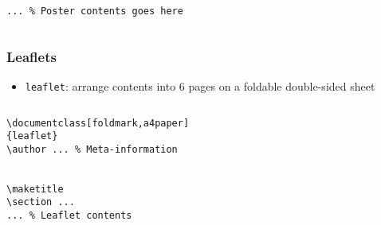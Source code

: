 \begin{frame}[fragile]
\begin{columns}
\begin{column}{.5\textwidth}
\begin{beamerboxesrounded}[width=\linewidth]{}
\begin{lstlisting}[basicstyle=\ttfamily\small,
moretexcs={usetheme,frametitle,frame},
emph={beamer,beamerposter,frame},
escapechar={:},lineskip=-2pt]
... % Poster contents goes here

\end{lstlisting}
\end{beamerboxesrounded}
\end{column}
\begin{column}{.48\textwidth}
\centering
%
\end{column}
\end{columns}

\end{frame}


\begin{frame}[fragile]
\frametitle{Leaflets}

\begin{itemize}
\item \texttt{leaflet}: arrange contents into 6 pages on a foldable double-sided sheet
\end{itemize}

\begin{columns}
\begin{column}{.496\textwidth}
\begin{beamerboxesrounded}[width=\linewidth]{}
\begin{lstlisting}[basicstyle=\ttfamily\small,lineskip=-2pt,emph={leaflet},moretexcs={maketitle}]
\documentclass[foldmark,a4paper]
{leaflet}
\author ... % Meta-information


\maketitle
\section ...
... % Leaflet contents

\end{lstlisting}
\end{beamerboxesrounded}
\end{column}
\begin{column}{.48\textwidth}
\centering
\par
\end{column}
\end{columns}

\end{frame}


